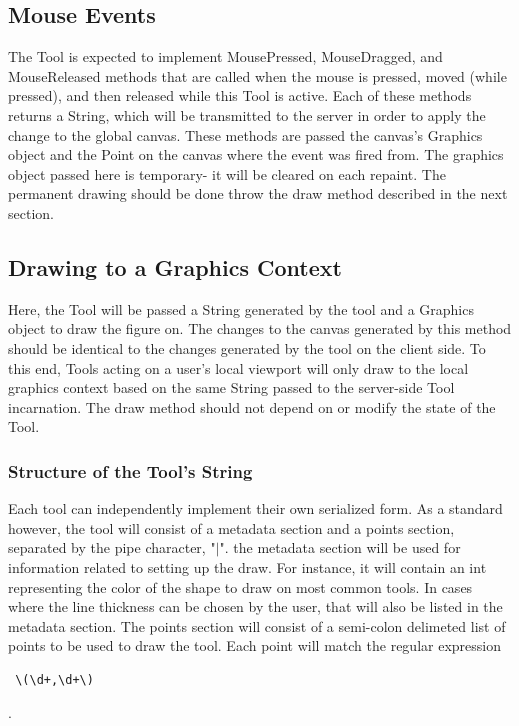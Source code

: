 \documentclass[11pt,oneside,a4paper]{article}
\begin{document}
 \subsection{Mouse Events}
  The Tool is expected to implement MousePressed, MouseDragged, and
  MouseReleased methods that are called when the mouse is pressed, moved (while
  pressed), and then released while this Tool is active. Each of these methods
  returns a String, which will be transmitted to the server in order to apply the
  change to the global canvas.  These methods are passed the canvas's Graphics
  object and the Point on the canvas where the event was fired from. The
  graphics object passed here is temporary- it will be cleared on each repaint.
  The permanent drawing should be done throw the draw method described in the
  next section.

 \subsection{Drawing to a Graphics Context}
  Here, the Tool will be passed a String generated by the tool and a Graphics
  object to draw the figure on. The changes to the canvas generated by this
  method should be identical to the changes generated by the tool on the client
  side. To this end, Tools acting on a user's local viewport will only draw to
  the local graphics context based on the same String passed to the server-side
  Tool incarnation. The draw method should not depend on or modify the state of
  the Tool.

 \subsubsection{Structure of the Tool's String}
 Each tool can independently implement their own serialized form. As a standard
 however, the tool will consist of a metadata section and a points section,
 separated by the pipe character, "$|$". the metadata section will be used for
 information related to setting up the draw. For instance, it will contain an
 int representing the color of the shape to draw on most common tools. In cases
 where the line thickness can be chosen by the user, that will also be listed
 in the metadata section. The points section will consist of a semi-colon
 delimeted list of points to be used to draw the tool. Each point will match
 the regular expression \begin{verbatim} \(\d+,\d+\) \end{verbatim}. 
 
\end{document}

